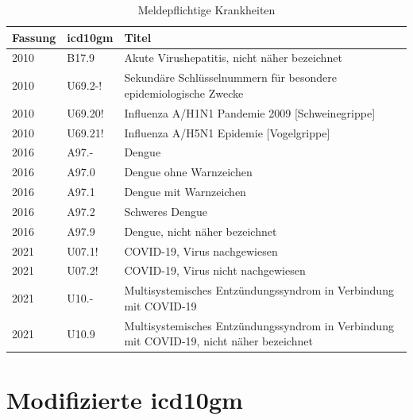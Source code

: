 \clearpage
\begin{table}[ht]
	\centering
	\small
	\caption[Meldepflichtige \acs{icd10gm}]{Meldepflichtige Krankheiten}
	\label{tab:meldung}
	\begin{tabular}{|l|l|p{10.5cm}|}
		\hline
		\rowcolor{lightgray} Fassung & \acs{icd10gm} & Titel \\ \hline
		2010 & B17.9 & Akute Virushepatitis, nicht näher bezeichnet \\ \hline
		2010 & U69.2-! & Sekundäre Schlüsselnummern für besondere epidemiologische Zwecke \\ \hline
		2010 & U69.20! & Influenza A/H1N1 Pandemie 2009 [Schweinegrippe] \\ \hline
		2010 & U69.21! & Influenza A/H5N1 Epidemie [Vogelgrippe] \\ \hline
		2016 & A97.- & Dengue \\ \hline
		2016 & A97.0 & Dengue ohne Warnzeichen \\ \hline
		2016 & A97.1 & Dengue mit Warnzeichen \\ \hline
		2016 & A97.2 & Schweres Dengue \\ \hline
		2016 & A97.9 & Dengue, nicht näher bezeichnet \\ \hline
		2021 & U07.1! & COVID-19, Virus nachgewiesen \\ \hline
		2021 & U07.2! & COVID-19, Virus nicht nachgewiesen \\ \hline
		2021 & U10.- & Multisystemisches Entzündungssyndrom in Verbindung mit COVID-19 \\ \hline
		2021 & U10.9 & Multisystemisches Entzündungssyndrom in Verbindung mit COVID-19, nicht näher bezeichnet \\ \hline
	\end{tabular}
\end{table}

\section{Modifizierte \acs{icd10gm}} \label{updicd}

